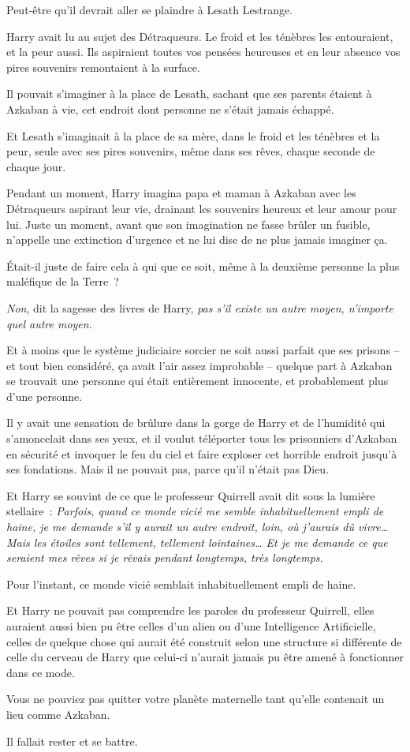 Peut-être qu'il devrait aller se plaindre à Lesath Lestrange.

Harry avait lu au sujet des Détraqueurs. Le froid et les ténèbres les entouraient, et la peur aussi. Ils aspiraient toutes vos pensées heureuses et en leur absence vos pires souvenirs remontaient à la surface.

Il pouvait s'imaginer à la place de Lesath, sachant que ses parents étaient à Azkaban à vie, cet endroit dont personne ne s'était jamais échappé.

Et Lesath s'imaginait à la place de sa mère, dans le froid et les ténèbres et la peur, seule avec ses pires souvenirs, même dans ses rêves, chaque seconde de chaque jour.

Pendant un moment, Harry imagina papa et maman à Azkaban avec les Détraqueurs aspirant leur vie, drainant les souvenirs heureux et leur amour pour lui. Juste un moment, avant que son imagination ne fasse brûler un fusible, n'appelle une extinction d'urgence et ne lui dise de ne plus jamais imaginer ça.

Était-il juste de faire cela à qui que ce soit, même à la deuxième personne la plus maléfique de la Terre~?

\emph{Non}, dit la sagesse des livres de Harry, \emph{pas s'il existe un autre moyen, n'importe quel autre moyen}.

Et à moins que le système judiciaire sorcier ne soit aussi parfait que ses prisons -- et tout bien considéré, ça avait l'air assez improbable -- quelque part à Azkaban se trouvait une personne qui était entièrement innocente, et probablement plus d'une personne.

Il y avait une sensation de brûlure dans la gorge de Harry et de l'humidité qui s'amoncelait dans ses yeux, et il voulut téléporter tous les prisonniers d'Azkaban en sécurité et invoquer le feu du ciel et faire exploser cet horrible endroit jusqu'à ses fondations. Mais il ne pouvait pas, parce qu'il n'était pas Dieu.

Et Harry se souvint de ce que le professeur Quirrell avait dit sous la lumière stellaire~: \emph{Parfois, quand ce monde vicié me semble inhabituellement empli de haine, je me demande s'il y aurait un autre endroit, loin, où j'aurais dû vivre… Mais les étoiles sont tellement, tellement lointaines… Et je me demande ce que seraient mes rêves si je rêvais pendant longtemps, très longtemps.}

Pour l'instant, ce monde vicié semblait inhabituellement empli de haine.

Et Harry ne pouvait pas comprendre les paroles du professeur Quirrell, elles auraient aussi bien pu être celles d'un alien ou d'une Intelligence Artificielle, celles de quelque chose qui aurait été construit selon une structure si différente de celle du cerveau de Harry que celui-ci n'aurait jamais pu être amené à fonctionner dans ce mode.

Vous ne pouviez pas quitter votre planète maternelle tant qu'elle contenait un lieu comme Azkaban.

Il fallait rester et se battre.
